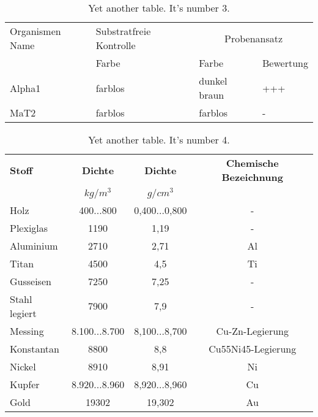 \begin{table}[H]\centering
	\libertineLF
\begin{tabular}{llll} \toprule
	Organismen Name & Substratfreie Kontrolle  & \multicolumn{2}{c}{Probenansatz} \\\cmidrule(rl){3-4}
	& Farbe & Farbe & Bewertung \\\midrule
	Alpha1 & farblos &  dunkel braun & +++ \\
	MaT2 & farblos & farblos & - \\\bottomrule
\end{tabular}
	\caption[Even more tables]{Yet another table. It’s number 3.}
	\label{tab:Organics}
	\libertineOsF
\end{table}

\begin{table}[H]\centering
	\libertineLF
\begin{tabular}{lccc}\toprule
	\textbf{Stoff}	&\textbf{Dichte} &\textbf{Dichte} &\textbf{Chemische Bezeichnung}	\\
	& \(kg/m^{3}\)	& \(g/cm^3\) 	& \\\midrule
	Holz		& 400...800	& 0,400...0,800	&- \\
	Plexiglas 	& 1190	& 1,19	& - 	\\
	Aluminium	& 2710	& 2,71	& Al	\\
	Titan		& 4500	& 4,5	& Ti	\\
	Gusseisen	& 7250	& 7,25	& - \\
	Stahl legiert& 7900	& 7,9	& - \\
	Messing		& 8.100...8.700	& 8,100...8,700	& Cu-Zn-Legierung\\
	Konstantan	& 8800	& 8,8	& Cu55Ni45-Legierung\\
	Nickel		& 8910	& 8,91  & Ni \\
	Kupfer		& 8.920...8.960	& 8,920...8,960	& Cu\\
	Gold		& 19302	& 19,302& Au	\\\bottomrule
\end{tabular}
	\caption[OMG! Even more tables]{Yet another table. It’s number 4.}
	\label{tab:Chemistry}
	\libertineOsF
\end{table}

